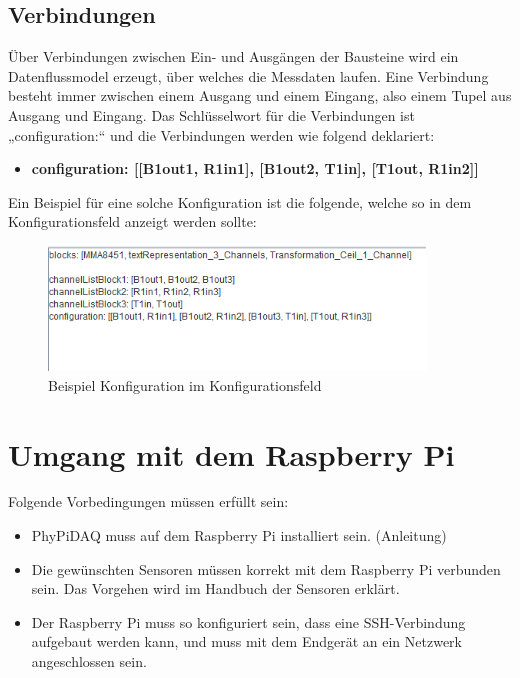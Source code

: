 \documentclass[parskip=full]{scrartcl}
\begin{document}
\subsection{Verbindungen}

Über Verbindungen zwischen Ein- und Ausgängen der Bausteine wird ein Datenflussmodel erzeugt, über welches die Messdaten laufen.  Eine Verbindung besteht immer zwischen einem Ausgang und einem Eingang, also einem Tupel aus Ausgang und Eingang.   
Das Schlüsselwort für die Verbindungen ist „configuration:“ und die Verbindungen werden wie folgend deklariert:  

\begin{itemize}

\item[ ] \textbf{configuration: [[B1out1, R1in1], [B1out2, T1in], [T1out, R1in2]]}

\end{itemize}

Ein Beispiel für eine solche Konfiguration ist die folgende, welche so in dem Konfigurationsfeld anzeigt werden sollte:

\begin{figure}[htbp]
    \begin{center}
        \includegraphics[width = 10cm]{Grafiken/KonfigBsp.png}
        \caption{Beispiel Konfiguration im Konfigurationsfeld}
        \label{KonfigBsp}
    \end{center}
\end{figure}


\clearpage
\section{Umgang mit dem Raspberry Pi}

Folgende Vorbedingungen müssen erfüllt sein:

\begin{itemize}

\item PhyPiDAQ muss auf dem Raspberry Pi installiert sein. (Anleitung)

\item Die gewünschten Sensoren müssen korrekt mit dem Raspberry Pi verbunden sein. Das Vorgehen wird im Handbuch der Sensoren erklärt.

\item Der Raspberry Pi muss so konfiguriert sein, dass eine SSH-Verbindung aufgebaut werden kann, und muss mit dem Endgerät an ein Netzwerk angeschlossen sein.

\end{itemize}
\end{document}
